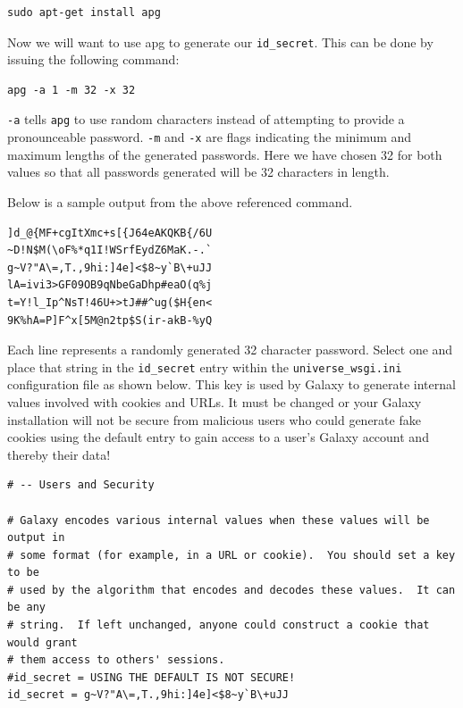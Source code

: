 \documentclass[a4paper,10pt]{article}
\begin{document}
\begin{lstlisting}
sudo apt-get install apg
\end{lstlisting}

Now we will want to use apg to generate our \texttt{\footnotesize{id\_secret}}.  This can be done by issuing the following command:

\begin{lstlisting}
apg -a 1 -m 32 -x 32
\end{lstlisting}

\texttt{\footnotesize{-a}} tells \texttt{\footnotesize{apg}} to use random characters instead of attempting to provide a pronounceable password.  \texttt{\footnotesize{-m}} and \texttt{\footnotesize{-x}} are flags indicating the minimum and maximum lengths of the generated passwords.  Here we have chosen 32 for both values so that all passwords generated will be 32 characters in length.

Below is a sample output from the above referenced command.

\begin{lstlisting}
]d_@{MF+cgItXmc+s[{J64eAKQKB{/6U
~D!N$M(\oF%*q1I!WSrfEydZ6MaK.-.`
g~V?"A\=,T.,9hi:]4e]<$8~y`B\+uJJ
lA=ivi3>GF09OB9qNbeGaDhp#eaO(q%j
t=Y!l_Ip^NsT!46U+>tJ##^ug($H{en<
9K%hA=P]F^x[5M@n2tp$S(ir-akB-%yQ
\end{lstlisting}

Each line represents a randomly generated 32 character password.  Select one and place that string in the \texttt{\footnotesize{id\_secret}} entry within the \texttt{\footnotesize{universe\_wsgi.ini}} configuration file as shown below.  This key is used by Galaxy to generate internal values involved with cookies and URLs.  It must be changed or your Galaxy installation will not be secure from malicious users who could generate fake cookies using the default entry to gain access to a user's Galaxy account and thereby their data!

\begin{lstlisting}
# -- Users and Security

# Galaxy encodes various internal values when these values will be output in
# some format (for example, in a URL or cookie).  You should set a key to be
# used by the algorithm that encodes and decodes these values.  It can be any
# string.  If left unchanged, anyone could construct a cookie that would grant
# them access to others' sessions.
#id_secret = USING THE DEFAULT IS NOT SECURE!
id_secret = g~V?"A\=,T.,9hi:]4e]<$8~y`B\+uJJ
\end{lstlisting}
\end{document}
